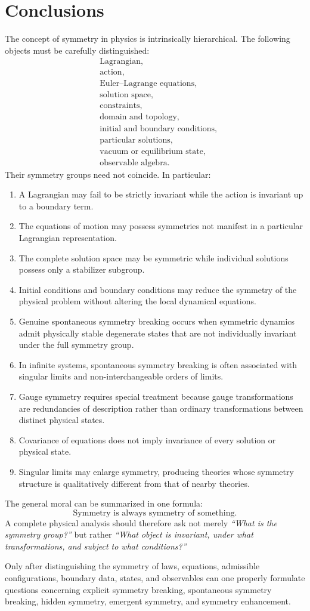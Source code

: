\section{ Conclusions}
The concept of symmetry in physics is intrinsically hierarchical.
The following objects must be carefully distinguished:
\[
\begin{aligned}
&\text{Lagrangian},\\
&\text{action},\\
&\text{Euler--Lagrange equations},\\
&\text{solution space},\\
&\text{constraints},\\
&\text{domain and topology},\\
&\text{initial and boundary conditions},\\
&\text{particular solutions},\\
&\text{vacuum or equilibrium state},\\
&\text{observable algebra}.
\end{aligned}
\]
Their symmetry groups need not coincide.
In particular:
\begin{enumerate}
\item A Lagrangian may fail to be strictly invariant while the action is
    invariant up to a boundary term.
\item The equations of motion may possess symmetries not manifest in a
    particular Lagrangian representation.
\item The complete solution space may be symmetric while individual solutions
    possess only a stabilizer subgroup.
\item Initial conditions and boundary conditions may reduce the symmetry of the
    physical problem without altering the local dynamical equations.
\item Genuine spontaneous symmetry breaking occurs when symmetric dynamics
    admit physically stable degenerate states that are not individually
        invariant under the full symmetry group.
\item In infinite systems, spontaneous symmetry breaking is often associated
    with singular limits and non-interchangeable orders of limits.
\item Gauge symmetry requires special treatment because gauge transformations
    are redundancies of description rather than ordinary transformations
        between distinct physical states.
\item Covariance of equations does not imply invariance of every solution or
    physical state.
\item Singular limits may enlarge symmetry, producing theories whose symmetry
    structure is qualitatively different from that of nearby theories.
\end{enumerate}
The general moral can be summarized in one formula:
\[
\boxed{
\text{Symmetry is always symmetry of something.}
}
\]
A complete physical analysis should therefore ask not merely
\emph{``What is the symmetry group?''} but rather
\emph{``What object is invariant, under what transformations, and subject 
to what conditions?''}

Only after distinguishing the symmetry of laws, equations, admissible
configurations, boundary data, states, and observables can one properly
formulate questions concerning explicit symmetry breaking, spontaneous symmetry
breaking, hidden symmetry, emergent symmetry, and symmetry enhancement.
